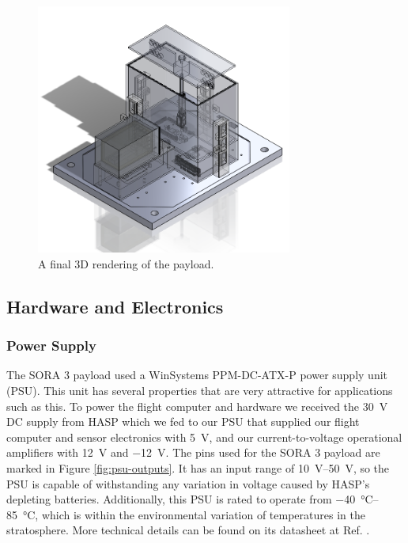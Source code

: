 \begin{figure}[h!]
	\begin{center}
		\includegraphics[width=0.75\textwidth]{figures/payload-transparent.png}
		\caption{A final 3D rendering of the payload.}
		\label{fig:payload-rendering}
	\end{center}
\end{figure}

\subsection{Hardware and Electronics}
\subsubsection{Power Supply}

The SORA 3 payload used a WinSystems PPM-DC-ATX-P power supply unit (PSU).
This unit has several properties that are very attractive for applications such as this. 
To power the flight computer and hardware we received the \SI{30}{\volt} DC supply from HASP which we fed to our PSU that supplied our flight computer and sensor electronics with \SI{+5}{\volt}, and our current-to-voltage operational amplifiers with \SI{+12}{\volt} and \SI{-12}{\volt}.
The pins used for the SORA 3 payload are marked in Figure \ref{fig:psu-outputs}.
It has an input range of \SIrange{10}{50}{\volt}, so the PSU is capable of withstanding any variation in voltage caused by HASP's depleting batteries.
Additionally, this PSU is rated to operate from \SIrange{-40}{85}{\celsius}, which is within the environmental variation of temperatures in the stratosphere.
More technical details can be found on its datasheet at Ref. \cite{WinSystems-PSU}.

